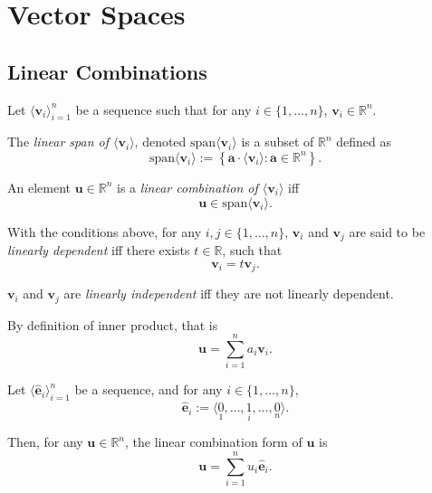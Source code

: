 
\chapter{Vector Spaces}


\section{Linear Combinations}


\begin{definition}
	\label{def: span and linear combination}
	Let $\langle\mathbf v_i\rangle_{i = 1}^n$ be a sequence such that for any $i \in \{1, \ldots, n\}$, $\mathbf v_i \in \mathbb R^n$.
	
	The \textit{linear span of $\langle \mathbf v_i\rangle$}, denoted $\mathrm{span}\langle \mathbf v_i\rangle$ is a subset of $\mathbb R^n$ defined as
	$$
	\mathrm{span}\langle \mathbf v_i\rangle := \left\{ \mathbf a \cdot \langle \mathbf v_i \rangle : \mathbf a \in \mathbb R^n \right\}.
	$$
	
	An element $\mathbf u \in \mathbb R^n$ is a \textit{linear combination of $\langle \mathbf v_i \rangle$} iff
	$$
	\mathbf u \in \mathrm{span} \langle \mathbf v_i \rangle.
	$$
\end{definition}


\begin{definition}
	\label{def: linear dependency}
	With the conditions above, for any $i,j \in \{1, \ldots, n\}$, $\mathbf v_i$ and $\mathbf v_j$ are said to be \textit{linearly dependent} iff there exists $t \in \mathbb R$, such that
	$$
	\mathbf v_i = t \mathbf v_j.
	$$
	
	$\mathbf v_i$ and $\mathbf v_j$ are \textit{linearly independent} iff they are not linearly dependent.
\end{definition}


\begin{note}
	By definition of inner product, that is
	$$
	\mathbf u = \sum_{i = 1}^n a_i \mathbf v_i.
	$$
\end{note}



\begin{note}
	Let $\langle \mathbf{\hat e}_i \rangle_{i = 1}^n$ be a sequence, and for any $i \in \{1, \ldots, n\}$,
	$$
	\mathbf{\hat e}_i := \langle \underset{1}{0}, \ldots, \underset{i}{1}, \ldots, \underset{n}{0} \rangle.
	$$
	
	Then, for any $\mathbf u \in \mathbb R^n$, the linear combination form of $\mathbf u$ is
	$$
	\mathbf u = \sum_{i = 1}^n u_i \mathbf{\hat e}_i.
	$$
\end{note}


